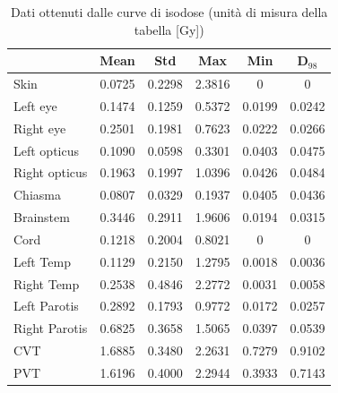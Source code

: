 \documentclass[a4paper,12pt]{article}
\begin{document}
                \begin{table}[H]
                        \centering
                        \label{tab:dati_malposizionamento_fotoni}
                        \begin{tabular}{
                            l | c | c | c | c | c |
                        }
                            \toprule
                            & Mean & Std & Max & Min & D$_{98}$\\
                            \midrule
                            Skin & 0.0725 & 0.2298 & 2.3816 & 0 & 0 \\
                            Left eye & 0.1474 & 0.1259 & 0.5372 & 0.0199 & 0.0242 \\
                            Right eye & 0.2501 & 0.1981 & 0.7623 & 0.0222 & 0.0266 \\
                            Left opticus & 0.1090 & 0.0598 & 0.3301 & 0.0403 & 0.0475 \\
                            Right opticus & 0.1963 & 0.1997 & 1.0396 & 0.0426 & 0.0484 \\
                            Chiasma & 0.0807 & 0.0329 & 0.1937 & 0.0405 & 0.0436 \\
                            Brainstem & 0.3446 & 0.2911 & 1.9606 & 0.0194 & 0.0315 \\
                            Cord & 0.1218 & 0.2004 & 0.8021 & 0 & 0 \\
                            Left Temp & 0.1129 & 0.2150 & 1.2795 & 0.0018 & 0.0036 \\
                            Right Temp & 0.2538 & 0.4846 & 2.2772 & 0.0031 & 0.0058 \\
                            Left Parotis & 0.2892 & 0.1793 & 0.9772 & 0.0172 & 0.0257 \\
                            Right Parotis & 0.6825 & 0.3658 & 1.5065 & 0.0397 & 0.0539 \\
                            CVT & 1.6885 & 0.3480 & 2.2631 & 0.7279 & 0.9102 \\
                            PVT & 1.6196 & 0.4000 & 2.2944 & 0.3933 & 0.7143 \\
                            \bottomrule
                        \end{tabular}
                        \caption{Dati ottenuti dalle curve di isodose (unità di misura della tabella [\unit{\gray}])}
                    \end{table}
\end{document}
